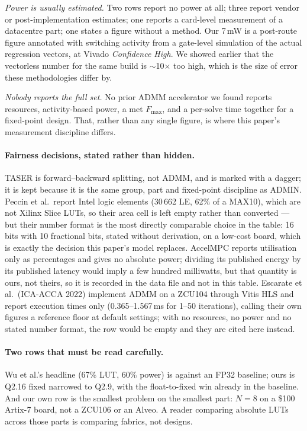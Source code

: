 \documentclass[11pt,a4paper]{article}
\begin{document}
\emph{Power is usually estimated.} Two rows report no power at all; three
report vendor or post-implementation estimates; one reports a card-level
measurement of a datacentre part; one states a figure without a method. Our
7\,mW is a post-route figure annotated with switching activity from a
gate-level simulation of the actual regression vectors, at Vivado
\emph{Confidence High}. We showed earlier that the vectorless number for the
same build is $\sim$10$\times$ too high, which is the size of error these
methodologies differ by.

\emph{Nobody reports the full set.} No prior ADMM accelerator we found reports
resources, activity-based power, a met $F_{\max}$, and a per-solve time
together for a fixed-point design. That, rather than any single figure, is
where this paper's measurement discipline differs.

\paragraph{Fairness decisions, stated rather than hidden.} TASER is
forward--backward splitting, not ADMM, and is marked with a dagger; it is kept
because it is the same group, part and fixed-point discipline as ADMIN.
Peccin et al.\ report Intel logic elements (30\,662 LE, 62\% of a MAX10), which
are not Xilinx Slice LUTs, so their area cell is left empty rather than
converted --- but their number format is the most directly comparable choice in
the table: 16 bits with 10 fractional bits, stated without derivation, on a
low-cost board, which is exactly the decision this paper's model replaces.
AccelMPC reports utilisation only as percentages and gives no absolute power;
dividing its published energy by its published latency would imply a few
hundred milliwatts, but that quantity is ours, not theirs, so it is recorded in
the data file and not in this table. Escarate et al.\ (ICA-ACCA 2022) implement
ADMM on a ZCU104 through Vitis HLS and report execution times only
(0.365--1.567\,ms for 1--50 iterations), calling their own figures a reference
floor at default settings; with no resources, no power and no stated number
format, the row would be empty and they are cited here instead.

\paragraph{Two rows that must be read carefully.} Wu et al.'s headline (67\%
LUT, 60\% power) is against an FP32 baseline; ours is Q2.16 fixed narrowed to
Q2.9, with the float-to-fixed win already in the baseline. And our own row is
the smallest problem on the smallest part: $N=8$ on a \$100 Artix-7 board, not
a ZCU106 or an Alveo. A reader comparing absolute LUTs across those parts is
comparing fabrics, not designs.
\end{document}
